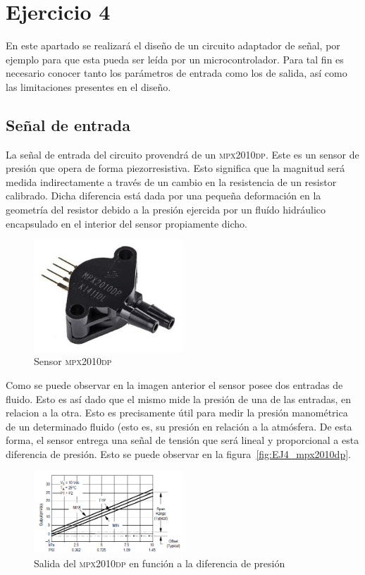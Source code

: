 \section{Ejercicio 4}
En este apartado se realizar\'a el dise\~no de un circuito adaptador de se\~nal, por ejemplo para que esta pueda ser le\'ida por un microcontrolador. Para tal fin es necesario conocer tanto los par\'ametros de entrada como los de salida, as\'i como las limitaciones presentes en el dise\~no.

\subsection{Se\~nal de entrada}
La se\~nal de entrada del circuito provendr\'a de un \textsc{mpx2010dp}. Este es un sensor de presi\'on que opera de forma piezorresistiva. Esto significa que la magnitud ser\'a medida indirectamente a trav\'es de un cambio en la resistencia de un resistor calibrado. Dicha diferencia est\'a dada por una peque\~na deformaci\'on en la geometr\'ia del resistor debido a la presi\'on ejercida por un flu\'ido hidr\'aulico encapsulado en el interior del sensor propiamente dicho.

\begin{figure}[H]
    \centering
    \includegraphics[width=0.5\textwidth]{../EJ4/resources/mpx2010dp.png}
    \caption{Sensor \textsc{mpx2010dp}}
    \label{fig:EJ4_mpx2010dp_image}
\end{figure}

Como se puede observar en la imagen anterior el sensor posee dos entradas de fluido. Esto es as\'i dado que el mismo mide la presi\'on de una de las entradas, en relacion a la otra. Esto es precisamente \'util para medir la presi\'on manom\'etrica de un determinado fluido (esto es, su presi\'on en relaci\'on a la atm\'osfera. De esta forma, el sensor entrega una se\~nal de tensi\'on que ser\'a lineal y proporcional a esta diferencia de presi\'on. Esto se puede observar en la figura~\ref{fig:EJ4_mpx2010dp}.

\begin{figure}[H]
    \centering
    \includegraphics[width=0.5\textwidth]{../EJ4/resources/mpx2010dp_out.png}
    \caption{Salida del \textsc{mpx2010dp} en funci\'on a la diferencia de presi\'on}
    \label{fig:EJ4_mpx2010dp_out}
\end{figure}

